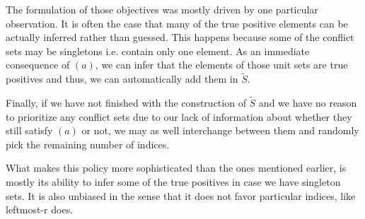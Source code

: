             The formulation of those objectives was mostly driven by one particular observation. It is often the case that many of the true positive elements can be actually inferred rather than guessed. 
            This happens because some of the conflict sets may be singletons i.e. contain only one element.
            As an immediate consequence of $(a)$, we can infer that the elements of those unit sets are true positives and thus, we can automatically add them in $\tilde{S}$.
            
            Finally, if we have not finished with the construction of $\tilde{S}$ and we have no reason to prioritize any conflict sets due to our lack of information about whether they still satisfy $(a)$ or not, we may as well interchange between them and randomly pick the remaining number of indices.

            What makes this policy more sophisticated than the ones mentioned earlier, is mostly its ability to infer some of the true positives in case we have singleton sets.
            It is also unbiased in the sense that it does not favor particular indices, like leftmost-r does.
            
